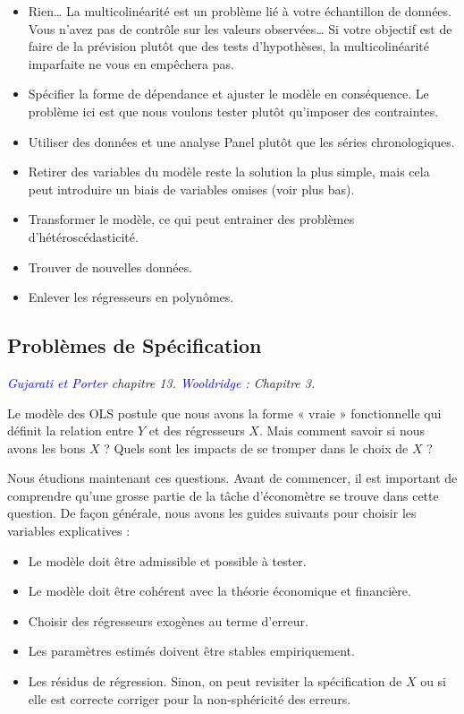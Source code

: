 \documentclass[14pt]{extarticle} %
\theoremstyle{definition}
\theoremstyle{plain}
\newcommand{\livre}[1]{\textcolor{blue}{#1}}
\begin{document}
\begin{itemize}
    \item Rien… La multicolinéarité est un problème lié à votre échantillon de données. Vous n’avez pas de contrôle sur les valeurs observées… Si votre objectif est de faire de la prévision plutôt que des tests d’hypothèses, la multicolinéarité imparfaite ne vous en empêchera pas.
    \item Spécifier la forme de dépendance et ajuster le modèle en conséquence. Le problème ici est que nous voulons tester plutôt qu’imposer des contraintes.
    \item Utiliser des données et une analyse Panel plutôt que les séries chronologiques.
    \item Retirer des variables du modèle reste la solution la plus simple, mais cela peut introduire un biais de variables omises (voir plus bas).
    \item Transformer le modèle, ce qui peut entrainer des problèmes d’hétéroscédasticité.
    \item Trouver de nouvelles données.
    \item Enlever les régresseurs en polynômes.
\end{itemize}

\subsection{Problèmes de Spécification}

\textit{\livre{Gujarati et Porter} chapitre 13. \livre{Wooldridge} : Chapitre 3.}

Le modèle des OLS postule que nous avons la forme « vraie » fonctionnelle qui définit la relation entre $Y$ et des régresseurs $X$. Mais comment savoir si nous avons les bons $X$ ? Quels sont les impacts de se tromper dans le choix de $X$ ?

Nous étudions maintenant ces questions. Avant de commencer, il est important de comprendre qu’une grosse partie de la tâche d’économètre se trouve dans cette question. De façon générale, nous avons les guides suivants pour choisir les variables explicatives :
\begin{itemize}
    \item Le modèle doit être admissible et possible à tester.
    \item Le modèle doit être cohérent avec la théorie économique et financière.
    \item Choisir des régresseurs exogènes au terme d’erreur.
    \item Les paramètres estimés doivent être stables empiriquement.
    \item Les résidus de régression. Sinon, on peut revisiter la spécification de $X$ ou si elle est correcte corriger pour la non-sphéricité des erreurs.
\end{itemize}
\end{document}
